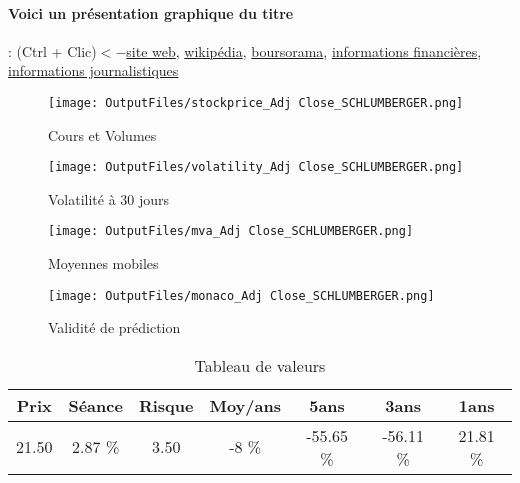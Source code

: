 \documentclass[11pt,a4paper]{report}%
\begin{document}
\paragraph{Voici un présentation graphique du titre} : (Ctrl + Clic)$<-$\href{https://investorcenter.slb.com/}{site web}, \href{https://fr.wikipedia.org/wiki/Schlumberger_(entreprise)}{wikipédia}, \href{https://www.boursorama.com/cours/1rPSLB}{boursorama}, \href{https://www.qwant.com/?q=site:https:%2f%2fwww.easybourse.com%2faction-societe%2fSCHLUMBERGER&t=web&client=ext-firefox-hp}{informations financières}, \href{https://bourse.lerevenu.com/cours-de-bourse/fiche-valeur-synthese/SCHLUMBERGER/SLB-FR}{informations journalistiques}
\begin{figure}[!htb]
   \begin{minipage}{0.5\textwidth}
     \centering
     \texttt{[image: OutputFiles/stockprice\_Adj Close\_SCHLUMBERGER.png]}
     \caption{Cours et Volumes}\label{Fig:price_SCHLUMBERGER}
   \end{minipage}\hfill
   \begin{minipage}{0.5\textwidth}
     \centering
     \texttt{[image: OutputFiles/volatility\_Adj Close\_SCHLUMBERGER.png]}
     \caption{Volatilité à 30 jours}\label{Fig:volat_SCHLUMBERGER}
   \end{minipage}
\end{figure}
\begin{figure}[!htb]
   \begin{minipage}{0.5\textwidth}
     \centering
     \texttt{[image: OutputFiles/mva\_Adj Close\_SCHLUMBERGER.png]}
     \caption{Moyennes mobiles}\label{Fig:mva_SCHLUMBERGER}
   \end{minipage}\hfill
   \begin{minipage}{0.5\textwidth}
     \centering
     \texttt{[image: OutputFiles/monaco\_Adj Close\_SCHLUMBERGER.png]}
     \caption{Validité de prédiction}\label{Fig:prediction_SCHLUMBERGER}
   \end{minipage}
\end{figure}

\begin{table}[H]
  \centering
    \begin{tabular}{|c|c|c|c|c|c|c|}
    \hline
    Prix & Séance & Risque  & Moy/ans & 5ans & 3ans & 1ans \\
    \hline
    21.50 &    2.87 \%    & 3.50 & -8 \% & -55.65 \% & -56.11 \% & 21.81 \% \\
    \hline
    \end{tabular}%
        \label{tab:table_SCHLUMBERGER}%
      \caption{Tableau de valeurs}
\end{table}%
\end{document}
